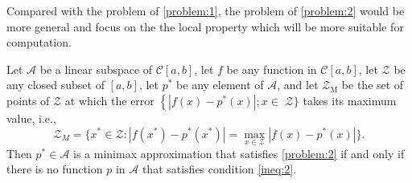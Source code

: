 \documentclass[11pt]{article}
\begin{document}
\begin{remark}
Compared with the problem of \eqref{problem:1}, the problem of \eqref{problem:2} would be more general and focus on the the local property which will be more suitable for computation.
\end{remark}


\begin{theorem} \label{thm:1}
Let $\mathscr{A}$ be a linear subspace of $\mathscr{C}[a, b]$, let $f$ be any function in $\mathscr{C}[a, b]$, let $\mathscr{Z}$ be any closed subset of $[a, b]$, let $p^{*}$ be any element of $\mathscr{A}$, and let $\mathscr{Z}_{\mathrm{M}}$ be the set of points of $\mathscr{Z}$ at which the error $\left\{\left|f(x)-p^{*}(x)\right| ; x \in\right.$ $\mathscr{Z}\}$ takes its maximum value, i.e.,
\[
\mathscr{Z}_M = \{x^*\in\mathscr{Z}: |f(x^*) - p^*(x^*)| = \max_{x\in\mathscr{Z}} |f(x)-p^*(x)| \}.
\]
Then $p^{*}\in\mathscr{A}$ is a minimax approximation that satisfies \eqref{problem:2} if and only if there is no function $p$ in $\mathscr{A}$ that satisfies condition \eqref{ineq:2}.
\end{theorem}
\end{document}
